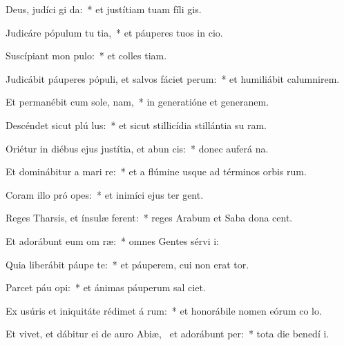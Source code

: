 \item Deus, judíci  gi da:~* et justítiam tuam fíli gis.
\item Judicáre pópulum tu  tia,~* et páuperes tuos in cio.
\item Suscípiant mon  pulo:~* et colles tiam.
\item Judicábit páuperes pópuli, et salvos fáciet  perum:~* et humiliábit calumnirem.
\item Et permanébit cum sole,   nam,~* in generatióne et generanem.
\item Descéndet sicut plú  lus:~* et sicut stillicídia stillántia su ram.
\item Oriétur in diébus ejus justítia, et abun cis:~* donec auferá na.
\item Et dominábitur a mari   re:~* et a flúmine usque ad términos orbis rum.
\item Coram illo pró opes:~* et inimíci ejus ter gent.
\item Reges Tharsis, et ínsulæ  ferent:~* reges Arabum et Saba dona cent.
\item Et adorábunt eum om  ræ:~* omnes Gentes sérvi i:
\item Quia liberábit páupe  te:~* et páuperem, cui non erat tor.
\item Parcet páu  opi:~* et ánimas páuperum sal ciet.
\item Ex usúris et iniquitáte rédimet á rum:~* et honorábile nomen eórum co lo.
\item Et vivet, et dábitur ei de auro Abiæ,~\pscross{} et adorábunt   per:~* tota die benedí i.
